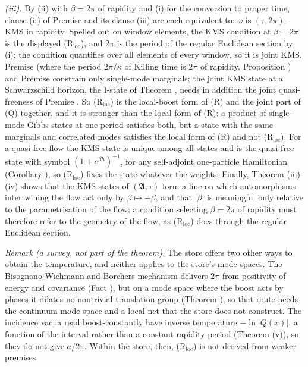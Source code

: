 \emph{(iii).} By (ii) with $\beta = 2\pi$ of rapidity and (i) for the conversion to proper time, clause (ii) of Premise  and its clause (iii) are each equivalent to: $\omega$ is $(\tau, 2\pi)$-KMS in rapidity. Spelled out on window elements, the KMS condition at $\beta = 2\pi$ is the displayed (R$_{\mathrm{loc}}$), and $2\pi$ is the period of the regular Euclidean section by (i); the condition quantifies over all elements of every window, so it is joint KMS. Premise  (where the period $2\pi/\kappa$ of Killing time is $2\pi$ of rapidity, Proposition ) and Premise  constrain only single-mode marginals; the joint KMS state at a Schwarzschild horizon, the I-state of Theorem , needs in addition the joint quasi-freeness of Premise . So (R$_{\mathrm{loc}}$) is the local-boost form of (R) and the joint part of (Q) together, and it is stronger than the local form of (R): a product of single-mode Gibbs states at one period satisfies both, but a state with the same marginals and correlated modes satisfies the local form of (R) and not (R$_{\mathrm{loc}}$). For a quasi-free flow the KMS state is unique among all states and is the quasi-free state with symbol $(1 + e^{\beta h})^{-1}$, for any self-adjoint one-particle Hamiltonian (Corollary ), so (R$_{\mathrm{loc}}$) fixes the state whatever the weights. Finally, Theorem (iii)-(iv) shows that the KMS states of $(\mathfrak{A}, \tau)$ form a line on which automorphisms intertwining the flow act only by $\beta \mapsto -\beta$, and that $|\beta|$ is meaningful only relative to the parametrisation of the flow; a condition selecting $\beta = 2\pi$ of rapidity must therefore refer to the geometry of the flow, as (R$_{\mathrm{loc}}$) does through the regular Euclidean section.

\emph{Remark (a survey, not part of the theorem).} The store offers two other ways to obtain the temperature, and neither applies to the store's mode spaces. The Bisognano-Wichmann and Borchers mechanism delivers $2\pi$ from positivity of energy and covariance (Fact ), but on a mode space where the boost acts by phases it dilates no nontrivial translation group (Theorem ), so that route needs the continuum mode space and a local net that the store does not construct. The incidence vacua read boost-constantly have inverse temperature $-\ln|Q(x)|$, a function of the interval rather than a constant rapidity period (Theorem (v)), so they do not give $a/2\pi$. Within the store, then, (R$_{\mathrm{loc}}$) is not derived from weaker premises.

